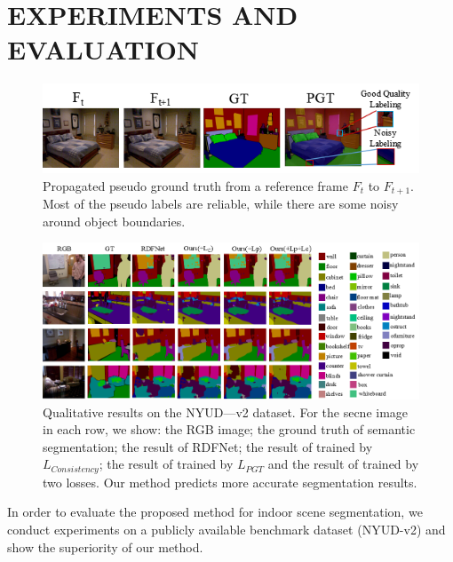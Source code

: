 \section{EXPERIMENTS AND EVALUATION}
\label{sec:exper}

\begin{figure}[t]
	\centering
	\includegraphics[scale=0.61]{figure/PGT.png}
	\caption{Propagated pseudo ground truth from a reference frame $F_t$ to $F_{t+1}$. Most of the pseudo labels are reliable, while there are some noisy around object boundaries.}
	\label{fig:PGT}
\end{figure}

\begin{figure}[!th]
	\centering
	\includegraphics[scale=0.65]{figure/Result.png}
	\caption{Qualitative results on the NYUD—v2 dataset. For the secne image in each row, we show: the RGB image; the ground truth of semantic segmentation; the result of RDFNet; the result of trained by $L_{Consistency}$; the result of trained by $L_{PGT}$ and the result of trained by two losses. Our method predicts more accurate segmentation results.}
	\label{fig:VisResult}
\end{figure}

In order to evaluate the proposed method for indoor scene segmentation, we conduct experiments on a publicly available benchmark dataset (NYUD-v2) and show the superiority of our method.


